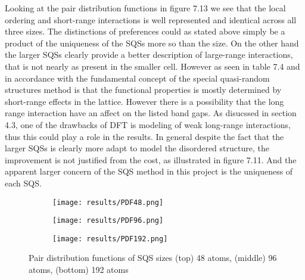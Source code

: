 Looking at the pair distribution functions in figure 7.13 we see that the local ordering and short-range interactions is well represented and identical across all three sizes. The distinctions of preferences could as stated above simply be a product of the uniqueness of the SQSs more so than the size. On the other hand the larger SQSs clearly provide a better description of large-range interactions, that is not nearly as present in the smaller cell. However as seen in table 7.4 and in accordance with the fundamental concept of the special quasi-random structures method is that the functional properties is mostly determined by short-range effects in the lattice. However there is a possibility that the long range interaction have an affect on the listed band gaps. As disucssed in section 4.3, one of the drawbacks of DFT is modeling of weak long-range interactions, thus this could play a role in the results. In general despite the fact that the larger SQSs is clearly more adapt to model the disordered structure, the improvement is not justified from the cost, as illustrated in figure 7.11. And the apparent larger concern of the SQS method in this project is the uniqueness of each SQS.

\begin{figure}[H]
\begin{subfigure}{\textwidth}
\texttt{[image: results/PDF48.png]}
\end{subfigure}
\begin{subfigure}{\textwidth}
\texttt{[image: results/PDF96.png]}
\end{subfigure}
\begin{subfigure}{\textwidth}
\texttt{[image: results/PDF192.png]}
\end{subfigure}
\caption{Pair distribution functions of SQS sizes (top) 48 atoms, (middle) 96 atoms, (bottom) 192 atoms}
\end{figure}
